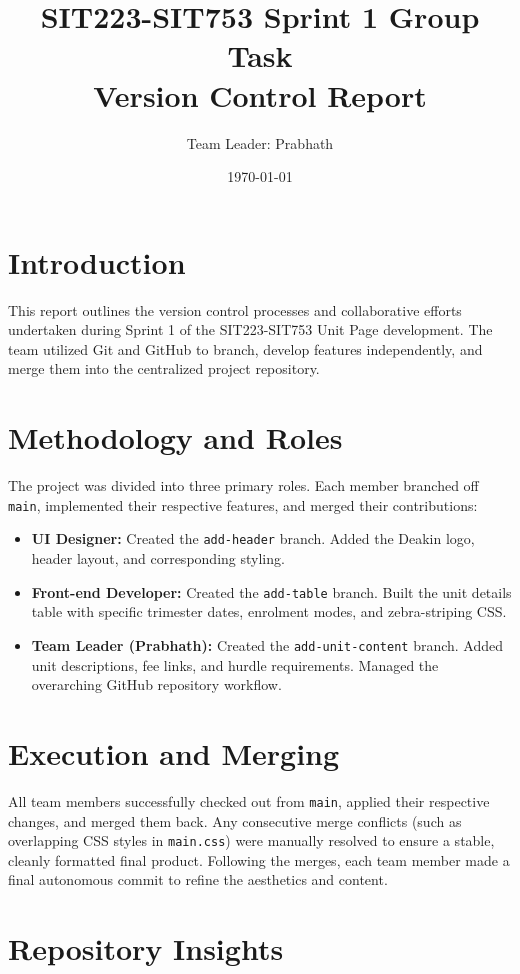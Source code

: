 \documentclass[12pt,a4paper]{article}
\title{SIT223-SIT753 Sprint 1 Group Task \\ \large Version Control Report}
\author{Team Leader: Prabhath}
\date{\today}
\begin{document}
\maketitle

\section{Introduction}
This report outlines the version control processes and collaborative efforts undertaken during Sprint 1 of the SIT223-SIT753 Unit Page development. The team utilized Git and GitHub to branch, develop features independently, and merge them into the centralized project repository.

\section{Methodology and Roles}
The project was divided into three primary roles. Each member branched off \texttt{main}, implemented their respective features, and merged their contributions:
\begin{itemize}
    \item \textbf{UI Designer:} Created the \texttt{add-header} branch. Added the Deakin logo, header layout, and corresponding styling.
    \item \textbf{Front-end Developer:} Created the \texttt{add-table} branch. Built the unit details table with specific trimester dates, enrolment modes, and zebra-striping CSS.
    \item \textbf{Team Leader (Prabhath):} Created the \texttt{add-unit-content} branch. Added unit descriptions, fee links, and hurdle requirements. Managed the overarching GitHub repository workflow.
\end{itemize}

\section{Execution and Merging}
All team members successfully checked out from \texttt{main}, applied their respective changes, and merged them back. Any consecutive merge conflicts (such as overlapping CSS styles in \texttt{main.css}) were manually resolved to ensure a stable, cleanly formatted final product. Following the merges, each team member made a final autonomous commit to refine the aesthetics and content.

\section{Repository Insights}
\end{document}
